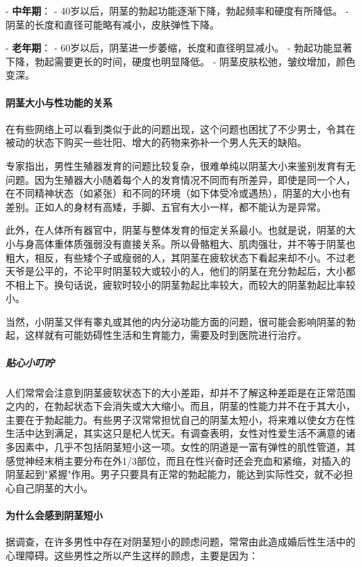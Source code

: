 - \textbf{中年期}：
  - 40岁以后，阴茎的勃起功能逐渐下降，勃起频率和硬度有所降低。
  - 阴茎的长度和直径可能略有减小，皮肤弹性下降。

- \textbf{老年期}：
  - 60岁以后，阴茎进一步萎缩，长度和直径明显减小。
  - 勃起功能显著下降，勃起需要更长的时间，硬度也明显降低。
  - 阴茎皮肤松弛，皱纹增加，颜色变深。

\paragraph{阴茎大小与性功能的关系}

在有些网络上可以看到类似于此的问题出现，这个问题也困扰了不少男士，令其在被动的状态下购买一些壮阳、增大的药物来弥补一个男人先天的缺陷。

专家指出，男性生殖器发育的问题比较复杂，很难单纯以阴茎大小来鉴别发育有无问题。因为生殖器大小随着每个人的发育情况不同而有所差异，即使是同一个人，在不同精神状态（如紧张）和不同的环境（如下体受冷或遇热），阴茎的大小也有差别。正如人的身材有高矮，手脚、五官有大小一样，都不能认为是异常。

此外，在人体所有器官中，阴茎与整体发育的恒定关系最小。也就是说，阴茎的大小与身高体重体质强弱没有直接关系。所以骨骼粗大、肌肉强壮，并不等于阴茎也粗大，相反，有些矮个子或瘦弱的人，其阴茎在疲软状态下看起来却不小。不过老天爷是公平的，不论平时阴茎较大或较小的人，他们的阴茎在充分勃起后，大小都不相上下。换句话说，疲软时较小的阴茎勃起比率较大，而较大的阴茎勃起比率较小。

当然，小阴茎又伴有睾丸或其他的内分泌功能方面的问题，很可能会影响阴茎的勃起，这样就有可能妨碍性生活和生育能力，需要及时到医院进行治疗。

\subparagraph{贴心小叮咛}

人们常常会注意到阴茎疲软状态下的大小差距，却并不了解这种差距是在正常范围之内的，在勃起状态下会消失或大大缩小。而且，阴茎的性能力并不在于其大小，主要在于勃起能力。有些男子汉常常担忧自己的阴茎太短小，将来难以使女方在性生活中达到满足，其实这只是杞人忧天。有调查表明，女性对性爱生活不满意的诸多因素中，几乎不包括阴茎短小这一项。女性的阴道是一富有弹性的肌性管道，其感觉神经末梢主要分布在外1/3部位，而且在性兴奋时还会充血和紧缩，对插入的阴茎起到"紧握"作用。男子只要具有正常的勃起能力，能达到实际性交，就不必担心自己阴茎的大小。

\paragraph{为什么会感到阴茎短小}

据调查，在许多男性中存在对阴茎短小的顾虑问题，常常由此造成婚后性生活中的心理障碍。这些男性之所以产生这样的顾虑，主要是因为：

